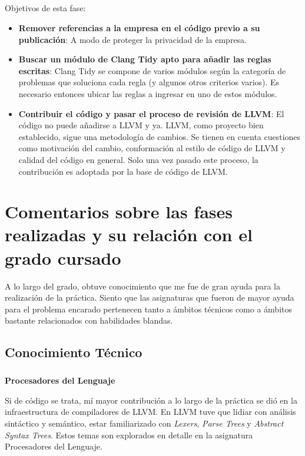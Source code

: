 \documentclass[12pt]{extreport} %
\begin{document}
\paragraph{}
Objetivos de esta fase:
\begin{itemize}
\item \textbf{Remover referencias a la empresa en el código previo a
  su publicación}: A modo de proteger la privacidad de la empresa.
\item \textbf{Buscar un módulo de Clang Tidy apto para añadir las
  reglas escritas}: Clang Tidy se compone de varios módulos según la
  categoría de problemas que soluciona cada regla (y algunos otros
  criterios varios). Es necesario entonces ubicar las reglas a
  ingresar en uno de estos módulos.
\item \textbf{Contribuir el código y pasar el proceso de revisión de
  LLVM}: El código no puede añadirse a LLVM y ya. LLVM, como proyecto
  bien establecido, sigue una metodología de cambios. Se tienen en
  cuenta cuestiones como motivación del cambio, conformación al estilo
  de código de LLVM y calidad del código en general. Solo una vez
  pasado este proceso, la contribución es adoptada por la base de
  código de LLVM.
\end{itemize}

\chapter{Comentarios sobre las fases realizadas y su relación con el
  grado cursado}

A lo largo del grado, obtuve conocimiento que me fue de gran ayuda
para la realización de la práctica. Siento que las asignaturas que
fueron de mayor ayuda para el problema encarado pertenecen tanto a
ámbitos técnicos como a ámbitos bastante relacionados con habilidades
blandas.

\section{Conocimiento Técnico}

\paragraph{}
\textbf{Procesadores del Lenguaje}

Si de código se trata, mí mayor contribución a lo largo de la práctica
se dió en la infraestructura de compiladores de LLVM. En LLVM tuve que
lidiar con análisis sintáctico y semántico, estar familiarizado con
\emph{Lexers}, \emph{Parse Trees} y \emph{Abstract Syntax
Trees}. Estos temas son explorados en detalle en la asignatura
Procesadores del Lenguaje.
\end{document}
